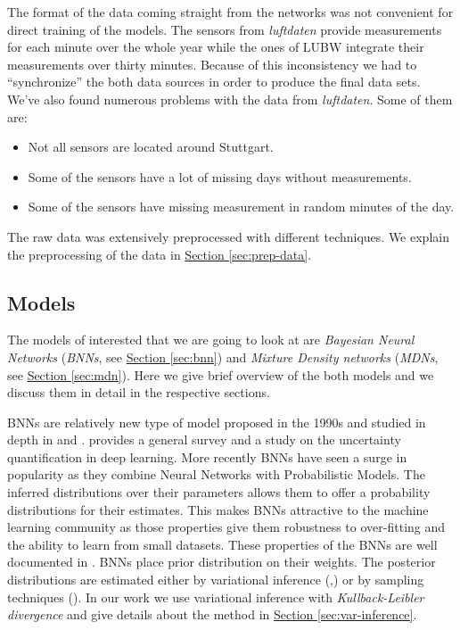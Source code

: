 \documentclass[12pt,a4paper,twoside]{scrartcl}
\numberwithin{equation}{section}
\newcommand{\refsec}[1]{\hyperref[#1]{Section \ref*{#1}}}
\begin{document}
The format of the data coming straight from the networks was not convenient for direct training of the models. The sensors from \emph{luftdaten} provide measurements for each minute over the whole year while the ones of LUBW integrate their measurements over thirty minutes. Because of this inconsistency we had to ``synchronize'' the both data sources in order to produce the final data sets. We've also found numerous problems with the data from \emph{luftdaten}. Some of them are:
\begin{itemize}
\item Not all sensors are located around Stuttgart.
\item Some of the sensors have a lot of missing days without measurements.
\item Some of the sensors have missing measurement in random minutes of the day.
\end{itemize}
The raw data was extensively preprocessed with different techniques. We explain the preprocessing of the data in \refsec{sec:prep-data}.
\subsection{Models}\label{sec:models}
The models of interested that we are going to look at are \emph{Bayesian Neural Networks} (\emph{BNNs}, see \refsec{sec:bnn}) and \emph{Mixture Density networks} (\emph{MDNs}, see \refsec{sec:mdn}). Here we give brief overview of the both models and we discuss them in detail in the respective sections.

BNNs are relatively new type of model proposed in the 1990s and studied in depth in \cite{mackay1992} and \cite{neal1996}. \cite{gal2016} provides a general survey and a study on the uncertainty quantification in deep learning. More recently BNNs have seen a surge in popularity as they combine Neural Networks with Probabilistic Models. The inferred distributions over their parameters allows them to offer a probability distributions for their estimates. This makes BNNs attractive to the machine learning community as those properties give them robustness to over-fitting and the ability to learn from small datasets. These properties of the BNNs are well documented in \cite{neal1996}. BNNs place prior distribution on their weights. The posterior distributions are estimated either by variational inference (\cite{blundell2015},\cite{paisley2012}) or by sampling techniques (\cite{vehtari2000}). In our work we use variational inference with \emph{Kullback-Leibler divergence} and give details about the method in \refsec{sec:var-inference}.
\end{document}
